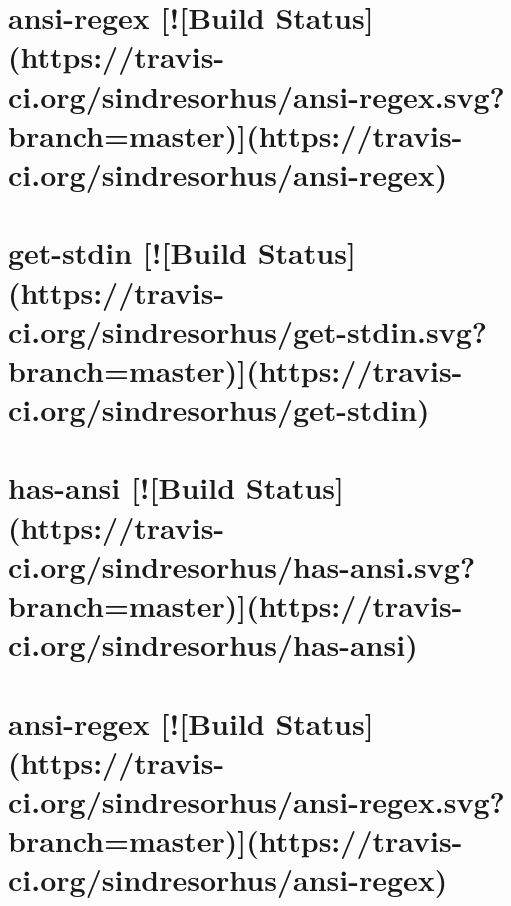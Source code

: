 \documentclass[twoside]{book}
\newcommand{\+}{\discretionary{\mbox{\scriptsize$\hookleftarrow$}}{}{}}
\begin{document}
\chapter{ansi-\/regex \mbox{[}!\mbox{[}Build Status\mbox{]}(https\+://travis-\/ci.org/sindresorhus/ansi-\/regex.svg?branch=master)\mbox{]}(https\+://travis-\/ci.org/sindresorhus/ansi-\/regex)}
\label{md__c_1__users_martin__documents__git_hub_visual_studio__bachelor__wis_r__wis_r_node_modules_grue514f9b923b067d95dd4b23c21e7c4ea}
\hypertarget{md__c_1__users_martin__documents__git_hub_visual_studio__bachelor__wis_r__wis_r_node_modules_grue514f9b923b067d95dd4b23c21e7c4ea}{}

\chapter{get-\/stdin \mbox{[}!\mbox{[}Build Status\mbox{]}(https\+://travis-\/ci.org/sindresorhus/get-\/stdin.svg?branch=master)\mbox{]}(https\+://travis-\/ci.org/sindresorhus/get-\/stdin)}
\label{md__c_1__users_martin__documents__git_hub_visual_studio__bachelor__wis_r__wis_r_node_modules_gru34c3c3fa32876148403a4e10b0af0ecf}
\hypertarget{md__c_1__users_martin__documents__git_hub_visual_studio__bachelor__wis_r__wis_r_node_modules_gru34c3c3fa32876148403a4e10b0af0ecf}{}

\chapter{has-\/ansi \mbox{[}!\mbox{[}Build Status\mbox{]}(https\+://travis-\/ci.org/sindresorhus/has-\/ansi.svg?branch=master)\mbox{]}(https\+://travis-\/ci.org/sindresorhus/has-\/ansi)}
\label{md__c_1__users_martin__documents__git_hub_visual_studio__bachelor__wis_r__wis_r_node_modules_gru15efaa300d9033ef9f18c10550b14db8}
\hypertarget{md__c_1__users_martin__documents__git_hub_visual_studio__bachelor__wis_r__wis_r_node_modules_gru15efaa300d9033ef9f18c10550b14db8}{}

\chapter{ansi-\/regex \mbox{[}!\mbox{[}Build Status\mbox{]}(https\+://travis-\/ci.org/sindresorhus/ansi-\/regex.svg?branch=master)\mbox{]}(https\+://travis-\/ci.org/sindresorhus/ansi-\/regex)}
\label{md__c_1__users_martin__documents__git_hub_visual_studio__bachelor__wis_r__wis_r_node_modules_gru5e33b015d65a8e00b27fc7eea74851db}
\hypertarget{md__c_1__users_martin__documents__git_hub_visual_studio__bachelor__wis_r__wis_r_node_modules_gru5e33b015d65a8e00b27fc7eea74851db}{}

\end{document}
